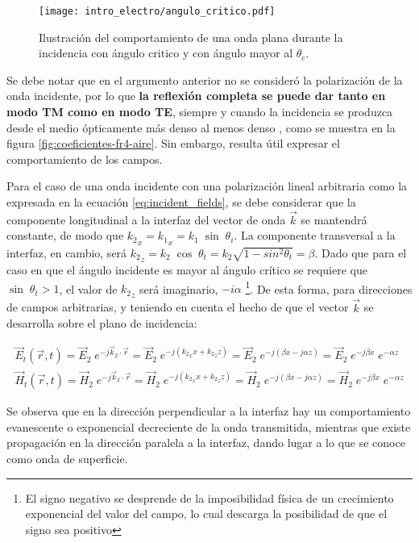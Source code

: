 \begin{figure}[htp]
	\centering
	\texttt{[image: intro\_electro/angulo\_critico.pdf]}
	\caption{Ilustración del comportamiento de una onda plana durante la incidencia con ángulo critico y con ángulo mayor al $\theta_c$.}
	\label{fig:angulo_critico}
\end{figure}

Se debe notar que en el argumento anterior no se consideró la polarización de la onda incidente, por lo que \textbf{la reflexión completa se puede dar tanto en modo TM como en modo TE}, siempre y cuando la incidencia se produzca desde el medio ópticamente más denso al menos denso \cite{Fernandez:Electromag}, como se muestra en la figura \ref{fig:coeficientes-fr4-aire}. Sin embargo, resulta útil expresar el comportamiento de los campos.

Para el caso de una onda incidente con una polarización lineal arbitraria como la expresada en la ecuación \ref{eq:incident_fields}, se debe considerar que la componente longitudinal a la interfaz del vector de onda $\vec{k}$ se mantendrá constante, de modo que ${k_2}_x = {k_1}_x = k_1 \; \sin \; \theta_i$. La componente transversal a la interfaz, en cambio, será ${k_2}_z = k_2\; \cos \; \theta_t = k_2 \sqrt{1-sin^2\theta_t} = \beta$. Dado que para el caso en que el ángulo incidente es mayor al ángulo crítico se requiere que $\sin\;\theta_t > 1$, el valor de ${k_2}_z$ será imaginario, $-i\alpha$ \footnote{El signo negativo se desprende de la imposibilidad física de un crecimiento exponencial del valor del campo, lo cual descarga la posibilidad de que el signo sea positivo}. De esta forma, para direcciones de campos arbitrarias, y teniendo en cuenta el hecho de que el vector $\vec{k}$ se desarrolla sobre el plano de incidencia:

\begin{subequations}
	\begin{align}
		\vec{E}_t (\vec{r},t) = \vec{E}_2 \; e^{-j \vec{k}_2 \cdot \vec{r}} = \vec{E}_2 \; e^{-j({k_2}_x x + {k_2}_z z)} = \vec{E}_2 \; e^{-j(\beta x - j\alpha z)} = \vec{E}_2 \; e^{-j\beta x} \; e^{- \alpha z}\\
		\vec{H}_t (\vec{r},t) = \vec{H}_2 \; e^{-j \vec{k}_2 \cdot \vec{r}} = \vec{H}_2 \; e^{-j({k_2}_x x + {k_2}_z z)} = \vec{H}_2 \; e^{-j(\beta x - j\alpha z)} = \vec{H}_2 \; e^{-j\beta x} \; e^{- \alpha z}
	\end{align}
\end{subequations}

Se observa que en la dirección perpendicular a la interfaz hay un comportamiento evanescente o exponencial decreciente de la onda transmitida, mientras que existe propagación en la dirección paralela a la interfaz, dando lugar a lo que se conoce como onda de superficie.

